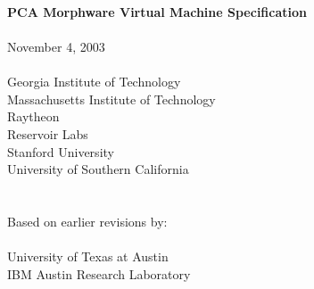 \documentclass[10pt]{article}
\begin{document}
  \begin{titlepage}
    \begin{center}
      {\LARGE
	~ \\ ~ \\ ~ \\ ~ \\ ~ \\ ~ \\ ~ \\ ~ \\
	{\bf PCA Morphware Virtual Machine Specification \\ ~ \\}
      }
      {\Large
	November 4, 2003 \\ ~ \\
      }
      {\large
	Georgia Institute of Technology \\
	Massachusetts Institute of Technology \\ Raytheon \\ Reservoir Labs \\ Stanford University \\ University of Southern California \\ ~ \\ ~ \\ 
	Based on earlier revisions by: \\ ~ \vspace{-8pt} \\
	University of Texas at Austin \\ IBM Austin Research Laboratory
      }
    \end{center}
  \end{titlepage}

  \newcommand{\mt}[1]{\mbox{\it #1}}
  \newcommand{\todo}[1]{\framebox{\bf #1}}
  \newcommand{\sss}[1]{\medskip \noindent {\bf #1} \smallskip}
  \newcommand{\ssss}[1]{\medskip \noindent {\bf #1:}}
  \newcommand{\makeline}[0]{\rule{0cm}{0cm}\\\hrule\rule{0cm}{0cm}}

  \newcommand{\lp}[2]{\raisebox{-6pt}{\parbox{#1}{#2 \vspace{2pt}}}}
  \newcommand{\lpp}[2]{\raisebox{-13pt}{\parbox{#1}{#2 \vspace{2pt}}}}

  \newcommand{\name}[1]{

    \medskip \noindent {\bf #1}
  }

  \newcommand{\decl}[1]{

    \medskip \noindent {\tt #1} \medskip
  }
\end{document}
